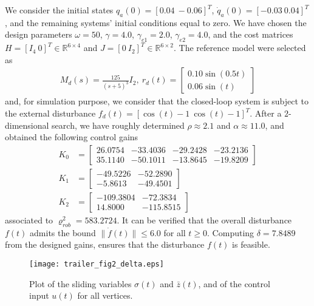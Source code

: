 \documentclass[twocolumn]{autarc_LH}
\newcommand{\Rf}{{\mathbb R}}
\begin{document}
We consider the initial states $q_a(0) = [0.04~-0.06]^T$, $\dot{q}_a(0)  =  [-0.03~0.04]^T$, and the remaining systems' initial conditions equal to zero. We have chosen the design parameters $\omega = 50$, $\gamma \!=\! 4.0$, $\gamma_{e1} = 2.0$, $\gamma_{e2} = 4.0$, and the cost matrices $H = [I_4~0]^T \in \Rf^{6 \times 4}$ and $J = [0~ I_2]^T \in \Rf^{6 \times 2}$. The reference model were selected as 
\begin{align*}
M_d(s) = \frac{125}{(s+5)^3} I_2,~ r_d(t) = \left [ \begin{array}{c} 0.10\sin(0.5t) \\ 0.06\sin(t) \end{array} \right ]
\end{align*}
and, for simulation purpose, we consider that the closed-loop system is subject to the external disturbance $f_d(t) \!=\! [\cos(t)-1~\cos(t)-1]^T$. After a $2$-dimensional search, we have roughly determined $\rho \approx 2.1$ and $\alpha \approx 11.0$, and obtained the following control gains
\begin{align*}
K_0 & = \left[ \begin{array}{rrrr}
   26.0754 & -33.4036 &  -29.2428 & -23.2136 \\
   35.1140 & -50.1011 & -13.8645 & -19.8209 
\end{array} \right] \\
K_1 & = \left[ \begin{array}{rr}
  -49.5226 & -52.2890 \\
   -5.8613 & -49.4501
\end{array} \right] \\
K_2 & = \left[ \begin{array}{rr}
 -109.3804 & -72.3834 \\
   14.8000 & -115.8515
\end{array} \right]
\end{align*}
associated to $\varrho_{rob}^2 = 583.2724$. It can be verified that the overall disturbance $f(t)$ admits the bound $\| \dot{f}(t) \| \leq 6.0$ for all $t \geq 0$. Computing $\delta = 7.8489$ from the designed gains, ensures that the disturbance $f(t)$ is feasible. 

\begin{figure}[t]
\hspace{0.7cm}\texttt{[image: trailer\_fig2\_delta.eps]}
\caption{Plot of the sliding variables $\sigma(t)$ and $\bar{z}(t)$, and of the control input $u(t)$ for all vertices.}
\label{fig03}
\end{figure}
\end{document}
